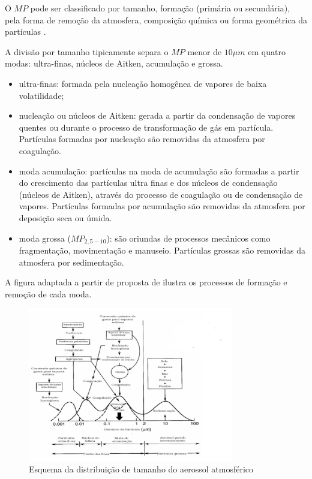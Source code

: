 O $MP$ pode ser classificado por tamanho, formação 
(primária ou secundária), pela forma de remoção da atmosfera, 
composição química ou forma geométrica da partículas \citep{seinfeld2012}.%

A divisão por tamanho tipicamente separa o $MP$ menor de 
$10 \mu m$ em quatro modas:
ultra-finas, núcleos de Aitken, acumulação e grossa. 

\begin{itemize}
  \item ultra-finas: formada pela nucleação homogênea de vapores de baixa volatilidade;
  \item nucleação ou núcleos de Aitken: 
        gerada a partir da condensação de vapores quentes ou durante o processo de 
        transformação de gás em partícula. Partículas formadas por 
        nucleação são removidas da atmosfera por coagulação.   
  \item moda acumulação: 
         partículas na moda de acumulação são formadas 
         a partir do crescimento das partículas ultra finas e dos núcleos 
         de condensação (núcleos de Aitken), através do processo de 
         coagulação ou de condensação de vapores. 
         Partículas formadas por acumulação
         são removidas da atmosfera por deposição seca ou úmida.%
  \item moda grossa ($MP_{2,5-10}$):
        são oriundas de processos mecânicos como fragmentação, 
        movimentação e manuseio. Partículas grossas são removidas da atmosfera 
        por sedimentação.
\end{itemize}

A figura adaptada a partir de proposta de \citep{finlayson1999} ilustra os processos de 
formação e remoção de cada moda.


\begin{figure}
\begin{center}
  \includegraphics[width=0.8\textwidth]{../inputs/images/modas_aerossol.png}
  \caption{Esquema da distribuição de tamanho do aerossol atmosférico 
           \citep{finlayson1999} \label{fig:modas_aerossol}}
\end{center}
\end{figure}

